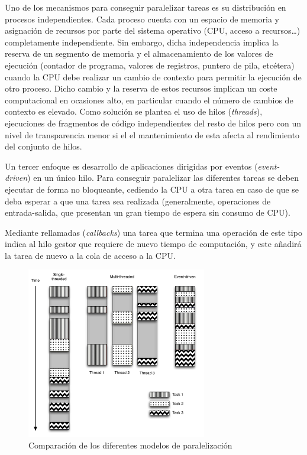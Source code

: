 Uno de los mecanismos para conseguir paralelizar tareas es su distribución en procesos independientes. Cada proceso cuenta con un espacio de memoria y asignación de recursos por parte del sistema operativo (CPU, acceso a recursos\dots) completamente independiente. Sin embargo, dicha independencia implica la reserva de un segmento de memoria y el almacenamiento de los valores de ejecución (contador de programa, valores de registros, puntero de pila, etcétera) cuando la CPU debe realizar un cambio de contexto para permitir la ejecución de otro proceso. Dicho cambio y la reserva de estos recursos implican un coste computacional en ocasiones alto, en particular cuando el número de cambios de contexto es elevado. Como solución se plantea el uso de hilos (\textit{threads}), ejecuciones de fragmentos de código independientes del resto de hilos pero con un nivel de transparencia menor si el el mantenimiento de esta afecta al rendimiento del conjunto de hilos.

Un tercer enfoque es desarrollo de aplicaciones dirigidas por eventos (\textit{event-driven}) en un único hilo. Para conseguir paralelizar las diferentes tareas se deben ejecutar de forma no bloqueante, cediendo la CPU a otra tarea en caso de que se deba esperar a que una tarea sea realizada (generalmente, operaciones de entrada-salida, que presentan un gran tiempo de espera sin consumo de CPU).

Mediante rellamadas (\textit{callbacks}) una tarea que termina una operación de este tipo indica al hilo gestor que requiere de nuevo tiempo de computación, y este añadirá la tarea de nuevo a la cola de acceso a la CPU.

\begin{figure}[H]
\centering
\includegraphics[width=0.7\textwidth]{Chapter2/Figures/threadcomparison}
\caption{Comparación de los diferentes modelos de paralelización}
\label{fig:threadcomparison}
\end{figure}

